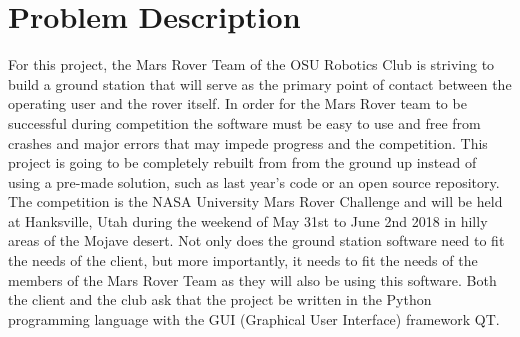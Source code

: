 \documentclass[onecolumn, draftclsnofoot, 10pt, compsoc]{IEEEtran}
\begin{document}
\section{Problem Description}\par
For this project, the Mars Rover Team of the OSU Robotics Club is striving to build a ground station that will serve as the primary point of contact between the operating user and the rover itself.
In order for the Mars Rover team to be successful during competition the software must be easy to use and free from crashes and major errors that may impede progress and the competition.
This project is going to be completely rebuilt from from the ground up instead of using a pre-made solution, such as last year's code or an open source repository.
The competition is the NASA University Mars Rover Challenge and will be held at Hanksville, Utah during the weekend of May 31st to June 2nd 2018 in hilly areas of the Mojave desert.
Not only does the ground station software need to fit the needs of the client, but more importantly, it needs to fit the needs of the members of the Mars Rover Team as they will also be using this software. 
Both the client and the club ask that the project be written in the Python programming language with the GUI (Graphical User Interface) framework QT.
\end{document}
